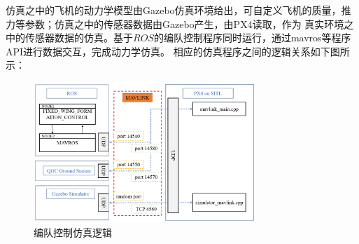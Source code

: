 仿真之中的飞机的动力学模型由Gazebo仿真环境给出，可自定义飞机的质量，推力等参数；仿真之中的传感器数据由Gazebo产生，由PX4读取，作为
真实环境之中的传感器数据的仿真。基于$ROS$的编队控制程序同时运行，通过mavros等程序API进行数据交互，完成动力学仿真。
相应的仿真程序之间的逻辑关系如下图所示：
\begin{figure}[H]
    \centering
    \includegraphics[width=0.75\textwidth]{figures/c4/px4_sitl_overview.png}
    \caption{编队控制仿真逻辑}\label{fig:px4_sitl_overview}
\end{figure}
